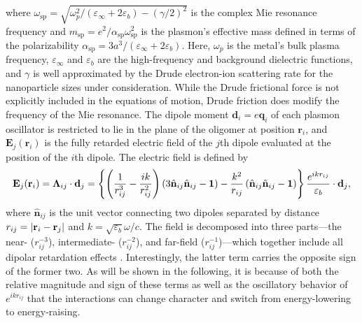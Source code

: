 \documentclass[journal=apchd5,manuscript=article]{achemso}
\begin{document}
where $\omega_{\textrm{sp}}=\sqrt{\omega_{p}^2/(\varepsilon_\infty+2\varepsilon_b)-(\gamma/2)^2}$ is the complex Mie resonance frequency and $m_{\textrm{sp}} = e^2/\alpha_{\textrm{sp}}\omega_{\textrm{sp}}^2$ is the plasmon's effective mass defined in terms of the polarizability $\alpha_{\textrm{sp}} = 3a^3/(\varepsilon_{\infty} + 2\varepsilon_b)$. Here, $\omega_p$ is the metal's bulk plasma frequency, $\varepsilon_{\infty}$ and $\varepsilon_b$ are the high-frequency and background dielectric functions, and $\gamma$ is well approximated by the Drude electron-ion scattering rate for the nanoparticle sizes under consideration. While the Drude frictional force is not explicitly included in the equations of motion, Drude friction does modify the frequency of the Mie resonance. The dipole moment $\textbf{d}_i = e\textbf{q}_i$ of each plasmon oscillator is restricted to lie in the plane of the oligomer at position $\textbf{r}_i$, and $\textbf{E}_j(\textbf{r}_i)$ is the fully retarded electric field of the $j$th dipole evaluated at the position of the $i$th dipole. The electric field is defined by
\begin{equation}
\textbf{E}_j(\textbf{r}_i) = \boldsymbol{\Lambda}_{ij}\cdot\textbf{d}_j\\
= \left\{\left(\frac{1}{r_{ij}^3} - \frac{ik}{r_{ij}^2}\right)\left(3\hat{\textbf{n}}_{ij}\hat{\textbf{n}}_{ij} - \textbf{1}\right) - \frac{k^2}{r_{ij}}\left(\hat{\textbf{n}}_{ij}\hat{\textbf{n}}_{ij} - \textbf{1}\right)\right\}\frac{e^{ikr_{ij}}}{\varepsilon_b}\cdot\textbf{d}_j,
\label{electric_field_lambda}
\end{equation}
where $\hat{\textbf{n}}_{ij}$ is the unit vector connecting two dipoles separated by distance $r_{ij}=|{\bf r}_i-{\bf r}_j|$ and $k=\sqrt{\varepsilon_b}\omega/c.$ The field is decomposed into three parts---the near- ($r_{ij}^{-3}$), intermediate- ($r_{ij}^{-2}$), and far-field ($r_{ij}^{-1}$)---which together include all dipolar retardation effects \cite{Purcell1973}. Interestingly, the latter term carries the opposite sign of the former two. As will be shown in the following, it is because of both the relative magnitude and sign of these terms as well as the oscillatory behavior of $e^{ikr_{ij}}$ that the interactions can change character and switch from energy-lowering to energy-raising.
\end{document}
